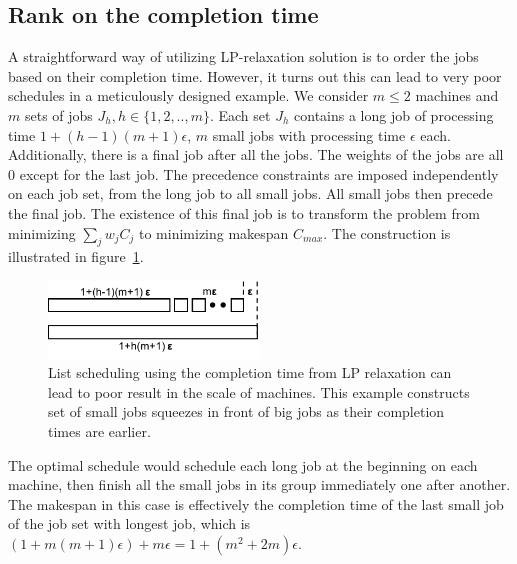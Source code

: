 \subsection{Rank on the completion time} \label{s:lpc}
A straightforward way of utilizing LP-relaxation solution is to order the jobs based on their completion time. However, it turns out this can lead to very poor schedules in a meticulously designed example. We consider $m \leq 2$ machines and $m$ sets of jobs $J_h, h\in\{1,2,..,m\}$. Each set $J_h$ contains a long job of processing time $1 + (h-1)(m+1)\epsilon$, $m$ small jobs with processing time $\epsilon$ each. Additionally, there is a final job after all the jobs. The weights of the jobs are all $0$ except for the last job. The precedence constraints are imposed independently on each job set, from the long job to all small jobs. All small jobs then precede the final job. The existence of this final job is to transform the problem from minimizing $\sum_jw_jC_j$ to minimizing makespan $C_{max}$. The construction is illustrated in figure~\ref{fig:lpc}.

\begin{figure}[h]
\centering
\includegraphics[width=0.5\textwidth]{figs/lpc.pdf}
\caption{List scheduling using the completion time from LP relaxation can lead to poor result in the scale of machines. This example constructs set of small jobs squeezes in front of big jobs as their completion times are earlier.}
\label{fig:lpc}
\end{figure}

The optimal schedule would schedule each long job at the beginning on each machine, then finish all the small jobs in its group immediately one after another. The makespan in this case is effectively the completion time of the last small job of the job set with longest job, which is $(1 + m(m+1)\epsilon) + m\epsilon = 1 +(m^2+2m)\epsilon$. 

